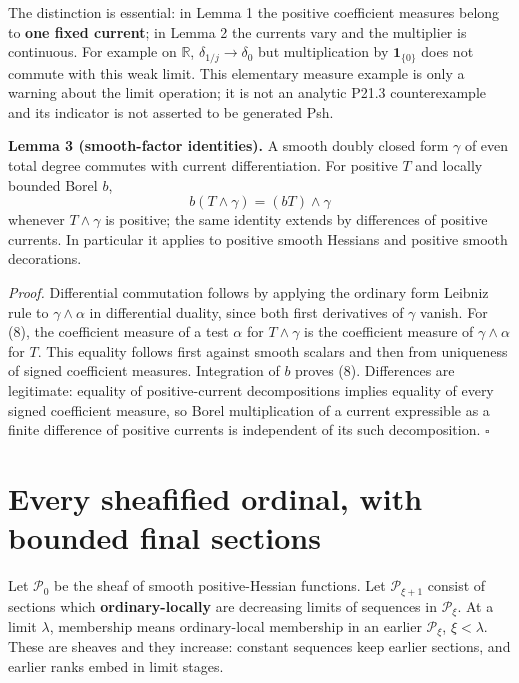 \documentclass[
  11pt,
]{article}
\begin{document}
The distinction is essential: in Lemma 1 the positive coefficient
measures belong to \textbf{one fixed current}; in Lemma 2 the currents
vary and the multiplier is continuous. For example on \(\mathbb R\),
\(\delta_{1/j}\to\delta_0\) but multiplication by \(\mathbf1_{\{0\}}\)
does not commute with this weak limit. This elementary measure example
is only a warning about the limit operation; it is not an analytic P21.3
counterexample and its indicator is not asserted to be generated Psh.

\textbf{Lemma 3 (smooth-factor identities).} A smooth doubly closed form
\(\gamma\) of even total degree commutes with current differentiation.
For positive \(T\) and locally bounded Borel \(b\),
\[b(T\wedge\gamma)=(bT)\wedge\gamma                           \tag{8}\]
whenever \(T\wedge\gamma\) is positive; the same identity extends by
differences of positive currents. In particular it applies to positive
smooth Hessians and positive smooth decorations.

\emph{Proof.} Differential commutation follows by applying the ordinary
form Leibniz rule to \(\gamma\wedge\alpha\) in differential duality,
since both first derivatives of \(\gamma\) vanish. For (8), the
coefficient measure of a test \(\alpha\) for \(T\wedge\gamma\) is the
coefficient measure of \(\gamma\wedge\alpha\) for \(T\). This equality
follows first against smooth scalars and then from uniqueness of signed
coefficient measures. Integration of \(b\) proves (8). Differences are
legitimate: equality of positive-current decompositions implies equality
of every signed coefficient measure, so Borel multiplication of a
current expressible as a finite difference of positive currents is
independent of its such decomposition. \(\square\)

\section{Every sheafified ordinal, with bounded final
sections}\label{every-sheafified-ordinal-with-bounded-final-sections}

Let \(\mathcal P_0\) be the sheaf of smooth positive-Hessian functions.
Let \(\mathcal P_{\xi+1}\) consist of sections which
\textbf{ordinary-locally} are decreasing limits of sequences in
\(\mathcal P_\xi\). At a limit \(\lambda\), membership means
ordinary-local membership in an earlier \(\mathcal P_\xi\),
\(\xi<\lambda\). These are sheaves and they increase: constant sequences
keep earlier sections, and earlier ranks embed in limit stages.
\end{document}
